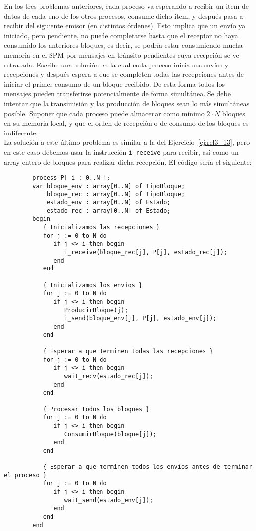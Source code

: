 \begin{ejercicio}\label{ej:rel3_14}
    En los tres problemas anteriores, cada proceso va esperando a recibir un item de datos de cada uno de los otros procesos, consume dicho item, y después pasa a recibir del siguiente emisor (en distintos órdenes). Esto implica que un envío ya iniciado, pero pendiente, no puede completarse hasta que el receptor no haya consumido los anteriores bloques, es decir, se podría estar consumiendo mucha memoria en el SPM por mensajes en tránsito pendientes cuya recepción se ve retrasada. Escribe una solución en la cual cada proceso inicia sus envíos y recepciones y después espera a que se completen todas las recepciones antes de iniciar el primer consumo de un bloque recibido. De esta forma todos los mensajes pueden transferirse potencialmente de forma simultánea. Se debe intentar que la transimisión y las producción de bloques sean lo más simultáneas posible. Suponer que cada proceso puede almacenar como mínimo $2\cdot N$ bloques en su memoria local, y que el orden de recepción o de consumo de los bloques es indiferente.\\

    La solución a este último problema es similar a la del Ejercicio~\ref{ej:rel3_13}, pero en este caso debemos usar la instrucción \verb|i_receive| para recibir, así como un array entero de bloques para realizar dicha recepción. El código sería el siguiente:
    \begin{verbatim}
        process P[ i : 0..N ];
        var bloque_env : array[0..N] of TipoBloque;
            bloque_rec : array[0..N] of TipoBloque;
            estado_env : array[0..N] of Estado;
            estado_rec : array[0..N] of Estado;
        begin
           { Inicializamos las recepciones }
           for j := 0 to N do
              if j <> i then begin
                 i_receive(bloque_rec[j], P[j], estado_rec[j]);
              end
           end

           { Inicializamos los envíos }
           for j := 0 to N do
              if j <> i then begin
                 ProducirBloque(j);
                 i_send(bloque_env[j], P[j], estado_env[j]);
              end
           end

           { Esperar a que terminen todas las recepciones }
           for j := 0 to N do
              if j <> i then begin
                 wait_recv(estado_rec[j]);
              end
           end

           { Procesar todos los bloques }
           for j := 0 to N do
              if j <> i then begin
                 ConsumirBloque(bloque[j]);
              end
           end

           { Esperar a que terminen todos los envíos antes de terminar el proceso }
           for j := 0 to N do
              if j <> i then begin
                 wait_send(estado_env[j]);
              end
           end
        end
    \end{verbatim}
\end{ejercicio}

